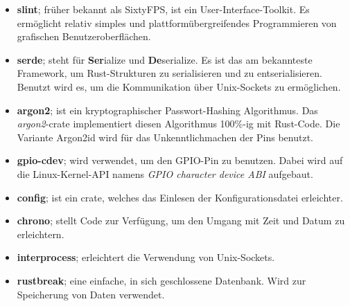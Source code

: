 \begin{itemize}
    \item \textbf{slint}; früher bekannt als SixtyFPS, ist ein User-Interface-Toolkit. Es ermöglicht relativ simples
    und plattformübergreifendes Programmieren von grafischen Benutzeroberflächen.

    \item \textbf{serde}; steht für \textbf{Ser}ialize und \textbf{De}serialize. Es ist das am bekannteste Framework,
    um Rust-Strukturen zu serialisieren und zu entserialisieren. Benutzt wird es, um die Kommunikation über Unix-Sockets zu
    ermöglichen.

    \item \textbf{argon2}; ist ein kryptographischer Passwort-Hashing Algorithmus. Das \textit{argon2}-crate implementiert diesen
    Algorithmus 100\%-ig mit Rust-Code. Die Variante Argon2id wird für das Unkenntlichmachen der Pins benutzt.

    \item \textbf{gpio-cdev}; wird verwendet, um den GPIO-Pin zu benutzen. Dabei wird auf die Linux-Kernel-API namens \textit{GPIO character device ABI}
    aufgebaut.

    \item \textbf{config}; ist ein crate, welches das Einlesen der Konfigurationsdatei erleichter.
    
    \item \textbf{chrono}; stellt Code zur Verfügung, um den Umgang mit Zeit und Datum zu erleichtern.
    
    \item \textbf{interprocess}; erleichtert die Verwendung von Unix-Sockets.
    
    \item \textbf{rustbreak}; eine einfache, in sich geschlossene Datenbank. Wird zur Speicherung von Daten verwendet.
\end{itemize}


